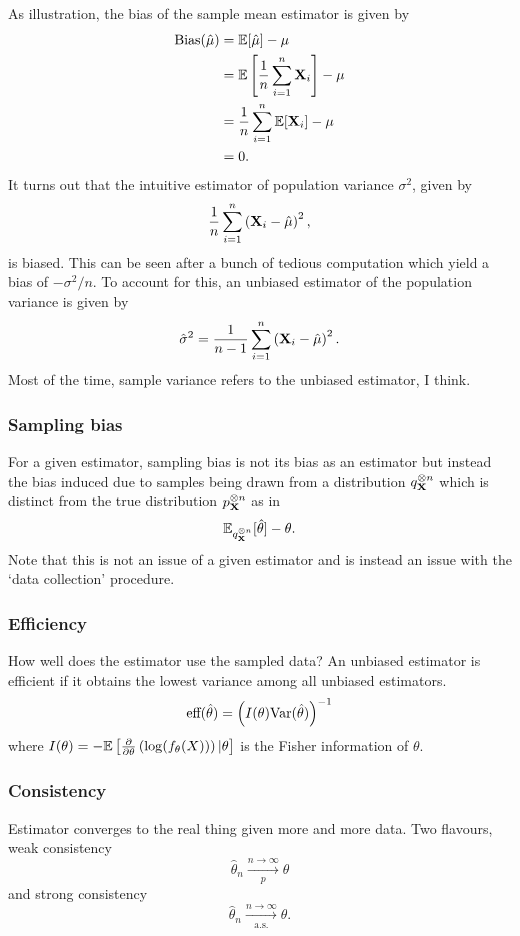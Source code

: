 \documentclass[11pt]{article}
\begin{document}
\begin{appendices}
As illustration, the bias of the sample mean estimator is given by
\begin{align*}
    \text{Bias}(\hat{\mu})
    &=
    \mathbb{E}[\hat{\mu}]-\mu\\
    &=
    \mathbb{E}\left[\frac{1}{n}\sum_{i=1}^n\mathbf{X}_i\right]-\mu\\
    &=
    \frac{1}{n}\sum_{i=1}^n\mathbb{E}[\mathbf{X}_i]-\mu\\
    &=
    0.
\end{align*}
It turns out that the intuitive estimator of population variance $\sigma^2$, given by
$$
\frac{1}{n}\sum_{i=1}^n\left(\mathbf{X}_i-\hat{\mu}\right)^2,
$$
is biased. This can be seen after a bunch of tedious computation which yield a bias of $-\sigma^2/n$. To account for this, an unbiased estimator of the population variance is given by
$$
\hat{\sigma}^2
=
\frac{1}{n-1}\sum_{i=1}^n\left(\mathbf{X}_i-\hat{\mu}\right)^2.
$$
Most of the time, sample variance refers to the unbiased estimator, I think.

\subsubsection{Sampling bias}
For a given estimator, sampling bias is not its bias as an estimator but instead the bias induced due to samples being drawn from a distribution $q_{\mathbf{X}}^{\otimes n}$ which is distinct from the true distribution $p_{\mathbf{X}}^{\otimes n}$ as in
$$\mathbb{E}_{q_{\mathbf{X}}^{\otimes n}}[\hat{\theta}]-\theta.$$
Note that this is not an issue of a given estimator and is instead an issue with the `data collection' procedure.

\subsubsection{Efficiency}
How well does the estimator use the sampled data? An unbiased estimator is efficient if it obtains the lowest variance among all unbiased estimators.
$$
\text{eff}(\hat{\theta})
=
\left(I(\theta)\text{Var}(\hat{\theta})\right)^{-1}
$$
where $I(\theta)=-\mathbb{E}\left[\frac{\partial}{\partial\theta}\left(\log(f_{\theta}(X))\right)|\theta\right]$ is the Fisher information of $\theta$.

\subsubsection{Consistency}
Estimator converges to the real thing given more and more data. Two flavours, weak consistency
$$
\hat{\theta}_n
\xrightarrow[p]{n\to\infty}
\theta
$$
and strong consistency
$$
\hat{\theta}_n
\xrightarrow[\text{a.s.}]{n\to\infty}
\theta.
$$


\end{appendices}
\end{document}
